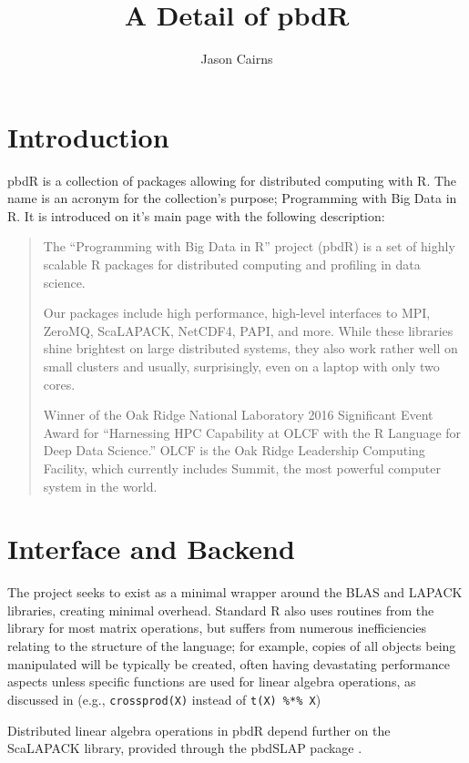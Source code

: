 \documentclass[a4paper,10pt]{article}
\begin{document}
\title{A Detail of pbdR}
\author{Jason Cairns}
  
\maketitle

\section{Introduction}
\label{sec:pbdr}

pbdR is a collection of packages allowing for distributed computing with
R\cite{pbdBASEpackage}. The name is an acronym for the collection's purpose;
Programming with Big Data in R. It is introduced on it's main page with the
following description:
\begin{quote}
	The ``Programming with Big Data in R'' project (pbdR) is a set of highly scalable
	R packages for distributed computing and profiling in data science.

	Our packages include high performance, high-level interfaces to MPI, ZeroMQ,
	ScaLAPACK, NetCDF4, PAPI, and more. While these libraries shine brightest on
	large distributed systems, they also work rather well on small clusters and
	usually, surprisingly, even on a laptop with only two cores.

	Winner of the Oak Ridge National Laboratory 2016 Significant Event Award for
	``Harnessing HPC Capability at OLCF with the R Language for Deep Data Science.''
	OLCF is the Oak Ridge Leadership Computing Facility, which currently includes
	Summit, the most powerful computer system in the world.\cite{pbdR2012}
\end{quote}

\section{Interface and Backend}
The project seeks to exist as a minimal wrapper around the BLAS and LAPACK
libraries, creating minimal overhead. Standard R also uses routines from the
library for most matrix operations, but suffers from numerous inefficiencies
relating to the structure of the language; for example, copies of all objects
being manipulated will be typically be created, often having devastating
performance aspects unless specific functions are used for linear algebra
operations, as discussed in \citeauthor{schmidt2017programming} (e.g.,
\texttt{crossprod(X)} instead of \texttt{t(X) \%*\% X})

Distributed linear algebra operations in pbdR depend further on the ScaLAPACK
library, provided through the pbdSLAP package \cite{Chen2012pbdSLAPpackage}.
\end{document}
